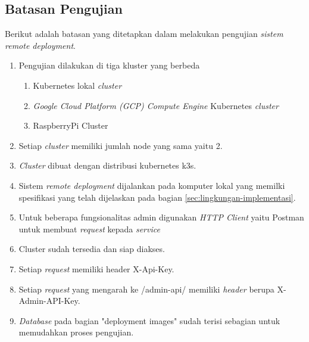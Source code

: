 \subsection{Batasan Pengujian}
\label{subsec:batasan-pengujian}
Berikut adalah batasan yang ditetapkan dalam melakukan pengujian \textit{sistem remote deployment}.

\begin{enumerate}
  \item Pengujian dilakukan di tiga kluster yang berbeda
        \begin{enumerate}
          \item Kubernetes lokal \textit{cluster}
          \item \textit{Google Cloud Platform (GCP) Compute Engine} Kubernetes \textit{cluster}
          \item RaspberryPi Cluster
        \end{enumerate}
  \item Setiap \textit{cluster} memiliki jumlah node yang sama yaitu 2.
  \item \textit{Cluster} dibuat dengan distribusi kubernetes k3s.
  \item Sistem \textit{remote deployment} dijalankan pada komputer lokal yang memilki spesifikasi yang telah dijelaskan pada bagian \ref{sec:lingkungan-implementasi}.
  \item Untuk beberapa fungsionalitas admin digunakan \textit{HTTP Client} yaitu Postman untuk membuat \textit{request} kepada \textit{service}
  \item Cluster sudah tersedia dan siap diakses.
  \item Setiap \textit{request} memiliki header X-Api-Key.
  \item Setiap \textit{request} yang mengarah ke /admin-api/ memiliki \textit{header} berupa X-Admin-API-Key.
  \item \textit{Database} pada bagian "deployment images" sudah terisi sebagian untuk memudahkan proses pengujian.
\end{enumerate}